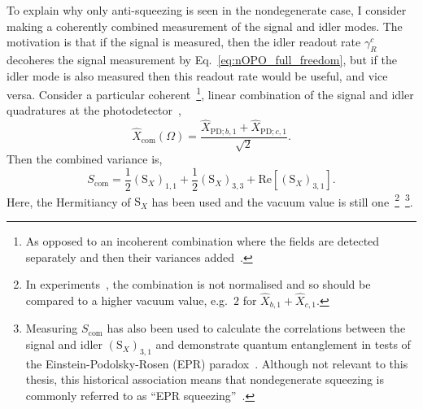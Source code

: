 To explain why only anti-squeezing is seen in the nondegenerate case, I consider making a coherently combined measurement of the signal and idler modes. The motivation is that if the signal is measured, then the idler readout rate $\gamma^c_R$ decoheres the signal measurement by Eq.~\ref{eq:nOPO_full_freedom}, but if the idler mode is also measured then this readout rate would be useful, and vice versa. Consider a particular coherent~\footnote{As opposed to an incoherent combination where the fields are detected separately and then their variances added~\cite{}.}, linear combination of the signal and idler quadratures at the photodetector~\cite{schoriNarrowbandFrequencyTunable2002}, 
\begin{equation}\label{eq:Xcom_eg}
\hat X_\text{com}(\Omega)=\frac{\hat X_{\text{PD};b,1}+\hat X_{\text{PD};c,1}}{\sqrt{2}}.
\end{equation} 
Then the combined variance is, %
\begin{equation}\label{eq:Scom_nOPO_eg}
S_\text{com}=\frac{1}{2}(\text{S}_X)_{1,1}+\frac{1}{2}(\text{S}_X)_{3,3}+\text{Re}[(\text{S}_X)_{3,1}].
\end{equation} 
Here, the Hermitiancy of $\text{S}_X$ has been used and the vacuum value is still one~\footnote{In experiments~\cite{schoriNarrowbandFrequencyTunable2002}, the combination is not normalised and so should be compared to a higher vacuum value, e.g.\ $2$ for $\hat X_{b,1} + \hat X_{c,1}$.}~\footnote{Measuring $S_\text{com}$ has also been used to calculate the correlations between the signal and idler $(\text{S}_X)_{3,1}$ and demonstrate quantum entanglement in tests of the Einstein-Podolsky-Rosen (EPR) paradox~\cite{PhysRev.47.777,reidDemonstrationEinsteinPodolskyRosenParadox1989,schoriNarrowbandFrequencyTunable2002}. Although not relevant to this thesis, this historical association means that nondegenerate squeezing is commonly referred to as ``EPR squeezing''~\cite{}.}. 
